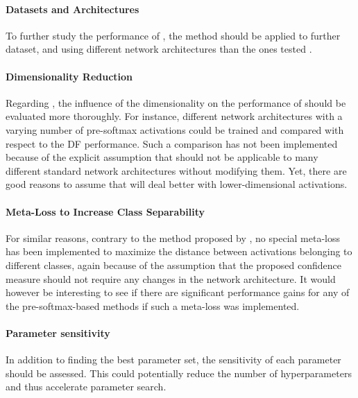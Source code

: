 \documentclass[10pt]{article}
\begin{document}
\paragraph{Datasets and Architectures} To further study the performance of , the method should be applied to further dataset, and using different network architectures than the ones tested \cite{ronneberger2015u,Berkeley2015HypercolumnsFO}.

\paragraph{Dimensionality Reduction} Regarding , the influence of the dimensionality on the performance of  should be evaluated more thoroughly. For instance, different network architectures with a varying number of pre-softmax activations could be trained and compared with respect to the \acrlong{DF} performance. Such a comparison has not been implemented because of the explicit assumption that  should not be applicable to many different standard network architectures without modifying them. Yet, there are good reasons to assume that  will deal better with lower-dimensional activations.

\paragraph{Meta-Loss to Increase Class Separability} For similar reasons, contrary to the method proposed by \textcite{mandelbaum17}, no special meta-loss has been implemented to maximize the distance between activations belonging to different classes, again because of the assumption that the proposed confidence measure should not require any changes in the network architecture. It would however be interesting to see if there are significant performance gains for any of the pre-softmax-based methods if such a meta-loss was implemented. 

\paragraph{Parameter sensitivity} In addition to finding the best parameter set, the sensitivity of each parameter should be assessed. This could potentially reduce the number of hyperparameters and thus accelerate parameter search.

\end{document}
